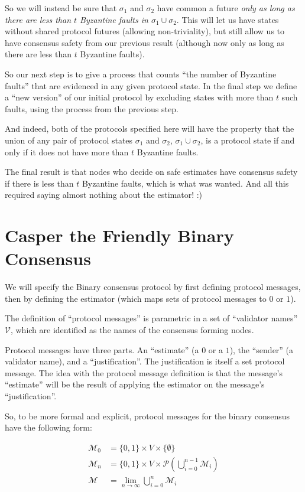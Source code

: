 \documentclass{article}
\theoremstyle{definition}
\begin{document}
So we will instead be sure that $\sigma_1$ and $\sigma_2$ have common a future \emph{only as long as there are less than $t$ Byzantine faults in $\sigma_1 \cup \sigma_2$}. This will let us have states without shared protocol futures (allowing non-triviality), but still allow us to have consensus safety from our previous result (although now only as long as there are less than $t$ Byzantine faults).

So our next step is to give a process that counts ``the number of Byzantine faults'' that are evidenced in any given protocol state. In the final step we define a ``new version'' of our initial protocol by excluding states with more than $t$ such faults, using the process from the previous step.

And indeed, both of the protocols specified here will have the property that the union of any pair of protocol states $\sigma_1$ and $\sigma_2$, $\sigma_1 \cup \sigma_2$, is a protocol state if and only if it does not have more than $t$ Byzantine faults.

The final result is that nodes who decide on safe estimates have consensus safety if there is less than $t$ Byzantine faults, which is what was wanted. And all this required saying almost nothing about the estimator! :)


\section{Casper the Friendly Binary Consensus}

We will specify the Binary consensus protocol by first defining protocol messages, then by defining the estimator (which maps sets of protocol messages to $0$ or $1$). 

The definition of ``protocol messages'' is parametric in a set of ``validator names'' $\mathcal{V}$, which are identified as the names of the consensus forming nodes.

Protocol messages have three parts. An ``estimate'' (a $0$ or a $1$), the ``sender'' (a validator name), and a ``justification''. The justification is itself a set protocol message. The idea with the protocol message definition is that the message's ``estimate'' will be the result of applying the estimator on the message's ``justification''.

So, to be more formal and explicit, protocol messages for the binary consensus have the following form:

\begin{equation}
\begin{split}
    \mathcal{M}_0 &= \{0, 1\} \times V \times \{\emptyset\}\\
    \mathcal{M}_n &= \{0, 1\} \times V \times \mathcal{P}(\bigcup_{i=0}^{n-1} \mathcal{M}_i)\\
    \mathcal{M} &= \lim_{n \to \infty} \bigcup_{i=0}^{n} \mathcal{M}_i
\end{split}
\end{equation}
\end{document}
